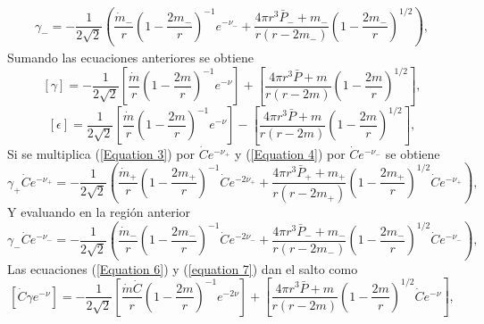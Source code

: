 \documentclass{article}
\begin{document}
\begin{align}
    \gamma_{-} = -\dfrac{1}{2\sqrt{2}}\left( \dfrac{\dot{m}_{-}}{r}\left( 1-\dfrac{2m_{-}}{r}\right)^{-1} e^{-\nu_{-}} + \dfrac{4\pi r^{3}\bar{P}_{-}+m_{-}}{r \left( r-2m_{-} \right)}\left(1-\dfrac{2m_{-}}{r} \right)^{1/2}\right),
    \label{Equation 4}
\end{align}
Sumando las ecuaciones anteriores se obtiene
\begin{equation}
 \left[   \gamma \right]= -\dfrac{1}{2\sqrt{2}}\left[  \dfrac{\dot{m}}{r}\left( 1-\dfrac{2m}{r}\right)^{-1} e^{-\nu} \right]+ \left[\dfrac{4\pi r^{3}\bar{P}+m}{r \left( r-2m \right)}\left(1-\dfrac{2m}{r} \right)^{1/2}\right],
 \label{Equation 5}
\end{equation}
\begin{equation}
  \left[  \epsilon \right]= \dfrac{1}{2\sqrt{2}}\left[  \dfrac{\dot{m}}{r}\left( 1-\dfrac{2m}{r}\right)^{-1} e^{-\nu} \right]- \left[\dfrac{4\pi r^{3}\bar{P}+m}{r \left( r-2m \right)}\left(1-\dfrac{2m}{r} \right)^{1/2}\right],
  \label{Equation 5.1}
\end{equation}
Si se multiplica (\ref{Equation 3}) por $\dot{C}e^{-\nu_{+}}$ y (\ref{Equation 4}) por $\dot{C}e^{-\nu_{-}}$ se obtiene
\begin{equation}
    \gamma_{+} \dot{C} e^{-\nu_{+}} = -\dfrac{1}{2\sqrt{2}}\left( \dfrac{\dot{m}_{+}}{r}\left( 1-\dfrac{2m_{+}}{r}\right)^{-1} \dot{C}e^{-2\nu_{+}} + \dfrac{4\pi r^{3}\bar{P}_{+}+m_{+}}{r \left( r-2m_{+} \right)}\left(1-\dfrac{2m_{+}}{r} \right)^{1/2}\dot{C}e^{-\nu_{+}}\right), 
    \label{Equation 6}
\end{equation}
Y evaluando en la región anterior
\begin{equation}
    \gamma_{-} \dot{C} e^{-\nu_{-}} = -\dfrac{1}{2\sqrt{2}}\left( \dfrac{\dot{m}_{-}}{r}\left( 1-\dfrac{2m_{-}}{r}\right)^{-1} \dot{C}e^{-2\nu_{-}} + \dfrac{4\pi r^{3}\bar{P}_{-}+m_{-}}{r \left( r-2m_{-} \right)}\left(1-\dfrac{2m_{-}}{r} \right)^{1/2}\dot{C}e^{-\nu_{-}}\right), 
    \label{equation 7}
    \end{equation}
    Las ecuaciones (\ref{Equation 6}) y (\ref{equation 7}) dan el salto como 
    \begin{equation}
        \left[ \dot{C}\gamma e^{-\nu}\right]= -\dfrac{1}{2\sqrt{2}}\left[  \dfrac{\dot{m} \dot{C}}{r}\left( 1-\dfrac{2m}{r}\right)^{-1} e^{-2\nu} \right] + \left[\dfrac{4\pi r^{3}\bar{P}+m}{r \left( r-2m \right)}\left(1-\dfrac{2m}{r} \right)^{1/2}\dot{C}e^{-\nu}\right],
        \label{Equation 9.1}
    \end{equation}
\end{document}
